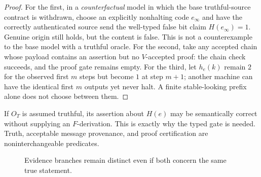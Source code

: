 \documentclass[11pt,letterpaper]{article}
\begin{document}
\begin{proof}
For the first, in a \emph{counterfactual} model in which the base truthful-source contract is withdrawn, choose an explicitly nonhalting code $e_{\infty}$ and have the correctly authenticated source send the well-typed false bit claim $H(e_{\infty})=1$. Genuine origin still holds, but the content is false. This is not a counterexample to the base model with a truthful oracle. For the second, take any accepted chain whose payload contains an assertion but no $V$-accepted proof: the chain check succeeds, and the proof gate remains empty. For the third, let $h_e(k)$ remain $2$ for the observed first $m$ steps but become $1$ at step $m+1$; another machine can have the identical first $m$ outputs yet never halt. A finite stable-looking prefix alone does not choose between them.
\end{proof}
\begin{remark}
If $O_T$ is assumed truthful, its assertion about $H(e)$ may be semantically correct without supplying an $F$-derivation. This is exactly why the typed gate is needed. Truth, acceptable message provenance, and proof certification are noninterchangeable predicates.
\end{remark}

\begin{figure}[htbp]\centering
{}
\caption{Evidence branches remain distinct even if both concern the same true statement.}
\end{figure}
\end{document}

